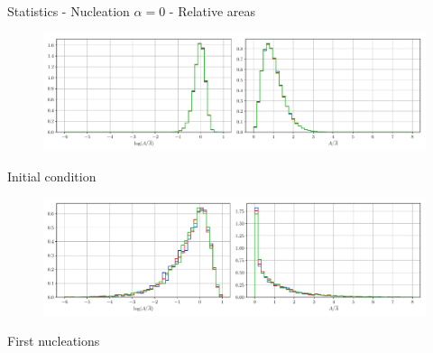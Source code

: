 \documentclass[usenames,dvipsnames]{beamer}
\begin{document}
\begin{frame}{Statistics - Nucleation $\alpha = 0$ - Relative areas}
\small
\centering
    \vspace{-0.5em}
    \begin{figure}
        \centering
        \includegraphics[scale=0.35]{figures/stored_energy/SE/areas/000000_nuclconstant_set.pdf}
    \end{figure}
    \vspace{-1em}
    Initial condition
    \begin{figure}
        \centering
        \includegraphics[scale=0.35]{figures/stored_energy/SE/areas/000070_nuclconstant_set.pdf}
    \end{figure}
    \vspace{-1em}
    First nucleations
\end{frame}
\end{document}
